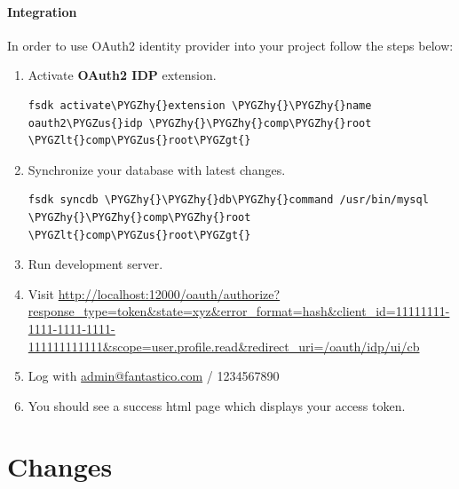 \documentclass[letterpaper,10pt,english]{sphinxmanual}
\def\PYGZus{\char`\_}
\def\PYGZlt{\char`\<}
\def\PYGZgt{\char`\>}
\def\PYGZhy{\char`\-}
\begin{document}
\subsubsection{Integration}
\label{features/components/oauth2/oauth2_idp/index:integration}
In order to use OAuth2 identity provider into your project follow the steps below:
\begin{enumerate}
\item {} 
Activate \textbf{OAuth2 IDP} extension.

\begin{Verbatim}[commandchars=\\\{\}]
fsdk activate\PYGZhy{}extension \PYGZhy{}\PYGZhy{}name oauth2\PYGZus{}idp \PYGZhy{}\PYGZhy{}comp\PYGZhy{}root \PYGZlt{}comp\PYGZus{}root\PYGZgt{}
\end{Verbatim}

\item {} 
Synchronize your database with latest changes.

\begin{Verbatim}[commandchars=\\\{\}]
fsdk syncdb \PYGZhy{}\PYGZhy{}db\PYGZhy{}command /usr/bin/mysql \PYGZhy{}\PYGZhy{}comp\PYGZhy{}root \PYGZlt{}comp\PYGZus{}root\PYGZgt{}
\end{Verbatim}

\item {} 
Run development server.

\item {} 
Visit \href{http://localhost:12000/oauth/authorize?response\_type=token\&state=xyz\&error\_format=hash\&client\_id=11111111-1111-1111-1111-111111111111\&scope=user.profile.read\&redirect\_uri=/oauth/idp/ui/cb}{http://localhost:12000/oauth/authorize?response\_type=token\&state=xyz\&error\_format=hash\&client\_id=11111111-1111-1111-1111-111111111111\&scope=user.profile.read\&redirect\_uri=/oauth/idp/ui/cb}

\item {} 
Log with \href{mailto:admin@fantastico.com}{admin@fantastico.com} / 1234567890

\item {} 
You should see a success html page which displays your access token.

\end{enumerate}


\chapter{Changes}
\label{changes:changes}\label{changes::doc}
\end{document}
